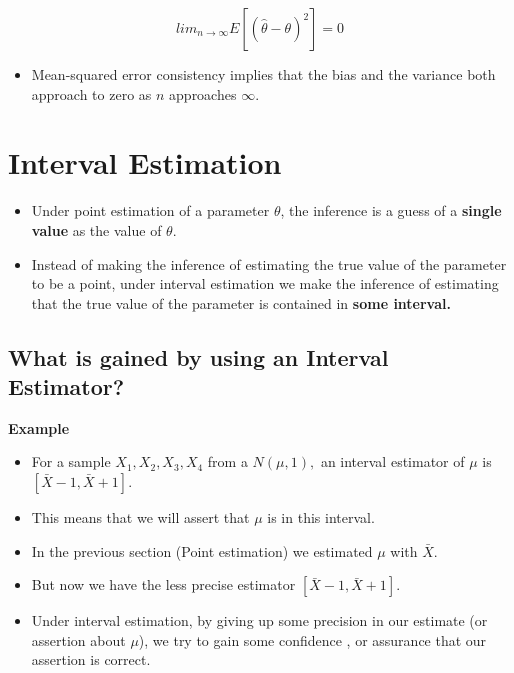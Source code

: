\documentclass[]{book}
\providecommand{\tightlist}{%
  \setlength{\itemsep}{0pt}\setlength{\parskip}{0pt}}
\begin{document}
\[lim_{n\rightarrow \infty}E\left[(\hat{\theta} - \theta)^2 \right]=0\]

\begin{itemize}
\tightlist
\item
  Mean-squared error consistency implies that the bias and the variance both approach to zero as \(n\) approaches \(\infty.\)
\end{itemize}

\newpage

\hypertarget{interval-estimation}{%
\section{Interval Estimation}\label{interval-estimation}}

\begin{itemize}
\item
  Under point estimation of a parameter \(\theta\), the inference is a guess of a \textbf{single value} as the value of \(\theta\).
\item
  Instead of making the inference of estimating the true value of the parameter to be a point, under interval estimation we make the inference of estimating that the true value of the parameter is contained in \textbf{some interval.}
\end{itemize}

\hypertarget{what-is-gained-by-using-an-interval-estimator}{%
\subsection{What is gained by using an Interval Estimator?}\label{what-is-gained-by-using-an-interval-estimator}}

\textbf{Example}

\begin{itemize}
\item
  For a sample \(X_1, X_2, X_3, X_4\) from a \(N(\mu, 1),\) an interval estimator of \(\mu\) is \([\bar{X}-1, \bar{X}+1].\)
\item
  This means that we will assert that \(\mu\) is in this interval.
\item
  In the previous section (Point estimation) we estimated \(\mu\) with \(\bar{X}.\)
\item
  But now we have the less precise estimator \([\bar{X}-1, \bar{X}+1]\).
\item
  Under interval estimation, by giving up some precision in our estimate (or assertion about \(\mu\)), we try to gain some confidence , or assurance that our assertion is correct.
\end{itemize}
\end{document}
